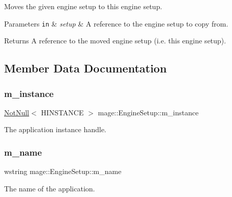 Moves the given engine setup to this engine setup.


\begin{DoxyParams}[1]{Parameters}
\mbox{\tt in}  & {\em setup} & A reference to the engine setup to copy from. \\
\hline
\end{DoxyParams}
\begin{DoxyReturn}{Returns}
A reference to the moved engine setup (i.\+e. this engine setup). 
\end{DoxyReturn}


\subsection{Member Data Documentation}
\mbox{\label{classmage_1_1_engine_setup_a2461909bce6fe90a75528726ceaf46f9}} 
\subsubsection{\texorpdfstring{m\+\_\+instance}{m\_instance}}
{\footnotesize\ttfamily \mbox{\hyperlink{namespacemage_a8769f9d670d6b585ea306cb1062af94b}{Not\+Null}}$<$ H\+I\+N\+S\+T\+A\+N\+CE $>$ mage\+::\+Engine\+Setup\+::m\+\_\+instance\hspace{0.3cm}{\ttfamily [private]}}

The application instance handle. \mbox{\label{classmage_1_1_engine_setup_a3866920e44c0752a89265f9f0c5c5d05}} 
\subsubsection{\texorpdfstring{m\+\_\+name}{m\_name}}
{\footnotesize\ttfamily wstring mage\+::\+Engine\+Setup\+::m\+\_\+name\hspace{0.3cm}{\ttfamily [private]}}

The name of the application. 